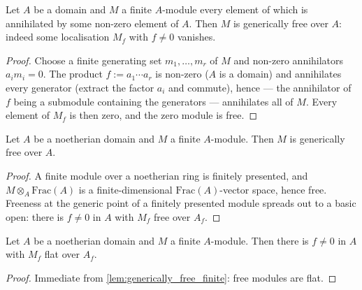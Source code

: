 \begin{lemma}
  \label{lem:generically_free_torsion}
  Let \(A\) be a domain and \(M\) a finite \(A\)-module every element of which
  is annihilated by some non-zero element of \(A\).  Then \(M\) is generically
  free over \(A\): indeed some localisation \(M_f\) with \(f \ne 0\) vanishes.
\end{lemma}

\begin{proof}
\leanok
  Choose a finite generating set \(m_1, \dots, m_r\) of \(M\) and non-zero
  annihilators \(a_i m_i = 0\).  The product \(f := a_1 \cdots a_r\) is
  non-zero (\(A\) is a domain) and annihilates every generator (extract the
  factor \(a_i\) and commute), hence — the annihilator of \(f\) being a
  submodule containing the generators — annihilates all of \(M\).  Every
  element of \(M_f\) is then zero, and the zero module is free.
\end{proof}

\begin{lemma}
  \label{lem:generically_free_finite}
  Let \(A\) be a noetherian domain and \(M\) a finite \(A\)-module.  Then \(M\)
  is generically free over \(A\).
\end{lemma}

\begin{proof}
\leanok
  A finite module over a noetherian ring is finitely presented, and
  \(M \otimes_A \mathrm{Frac}(A)\) is a finite-dimensional
  \(\mathrm{Frac}(A)\)-vector space, hence free.  Freeness at the generic
  point of a finitely presented module spreads out to a basic open: there is
  \(f \ne 0\) in \(A\) with \(M_f\) free over \(A_f\).
\end{proof}

\begin{lemma}
  \label{lem:generically_flat_finite}
  Let \(A\) be a noetherian domain and \(M\) a finite \(A\)-module.  Then there
  is \(f \ne 0\) in \(A\) with \(M_f\) flat over \(A_f\).
\end{lemma}

\begin{proof}
\leanok
  Immediate from \cref{lem:generically_free_finite}: free modules are flat.
\end{proof}

